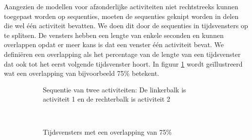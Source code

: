 \documentclass{article}
\begin{document}
Aangezien de modellen voor afzonderlijke activiteiten niet rechtstreeks kunnen toegepast worden op sequenties, moeten de sequenties geknipt worden in delen die wel \'e\'en activiteit bevatten. We doen dit door de sequenties in tijdsvensters op te splitsen. De vensters hebben een lengte van enkele seconden en kunnen overlappen opdat er meer kans is dat een venster \'e\'en activiteit bevat. We defini\"eren een overlapping als het percentage van de lengte van een tijdsvenster dat ook tot het eerst volgende tijdsvenster hoort. In figuur \ref{fig:overlap} wordt ge\"illustreerd wat een overlapping van bijvoorbeeld 75\% betekent.

\begin{figure}

\begin{subfigure}[b]{.90\linewidth}
\centering
{}
\caption{Sequentie van twee activiteiten: De linkerbalk is activiteit 1 en de rechterbalk is activiteit 2}
\end{subfigure}\\

\begin{subfigure}[b]{.90\linewidth}
\caption{Tijdsvensters met een overlapping van 75\%}
\label{fig:overlap}
  \end{subfigure} \\

\begin{subfigure}[b]{.90\linewidth}
\centering
{}
\end{subfigure}
\end{figure}
\end{document}
